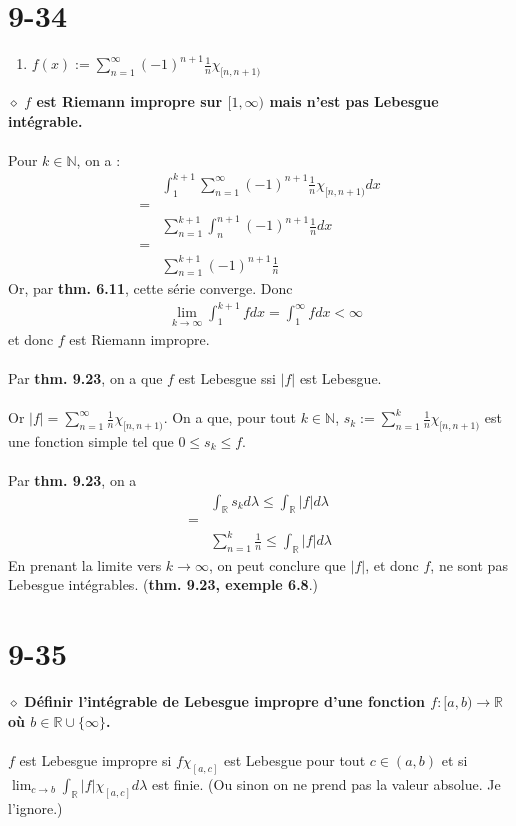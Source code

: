 \documentclass[a4paper,10pt]{article}
\begin{document}
\section*{9-34}
\begin{enumerate}
	\item $f(x) := \displaystyle \sum_{n=1}^\infty (-1)^{n+1} \frac{1}{n} \chi_{[n,n+1)}$
\end{enumerate}
$\diamond$ \textbf{$f$ est Riemann impropre sur $[1,\infty)$ mais n'est pas Lebesgue intégrable.}
\\
\\
Pour $k \in \mathbb{N}$, on a : 
\begin{align*}
	& \int_1^{k+1} \sum_{n=1}^\infty (-1)^{n+1} \frac{1}{n} \chi_{[n, n+1)} dx \\
	= \\
	& \sum_{n=1}^{k+1} \int_n^{n+1} (-1)^{n+1} \frac{1}{n} dx \\
	= \\
	& \sum_{n=1}^{k+1} (-1)^{n+1} \frac{1}{n}
\end{align*}
Or, par \textbf{thm. 6.11}, cette série converge. Donc
\begin{align*}
	& \lim_{k \to \infty} \int_1^{k+1} f dx = \int_1^\infty f dx < \infty
\end{align*}
et donc $f$ est Riemann impropre.
\\
\\
Par \textbf{thm. 9.23}, on a que $f$ est Lebesgue ssi $|f|$ est Lebesgue.
\\
\\
Or $|f| = \displaystyle \sum_{n=1}^\infty \frac{1}{n} \chi_{[n,n+1)}$. On a que, pour tout $k \in \mathbb{N}$, $s_k := \displaystyle \sum_{n=1}^k \frac{1}{n} \chi_{[n,n+1)}$ est une fonction simple tel que $0 \leq s_k \leq f$. 
\\
\\
Par \textbf{thm. 9.23}, on a 
\begin{align*}
	& \int_\mathbb{R} s_k d\lambda \leq \int_\mathbb{R} |f| d\lambda \\
	= \\
	& \sum_{n=1}^k \frac{1}{n} \leq \int_\mathbb{R} |f| d\lambda
\end{align*} 
En prenant la limite vers $k \rightarrow \infty$, on peut conclure que $|f|$, et donc $f$, ne sont pas Lebesgue intégrables. (\textbf{thm. 9.23, exemple 6.8}.)

\section*{9-35}
$\diamond$ \textbf{Définir l'intégrable de Lebesgue impropre d'une fonction $f :[a,b) \rightarrow \mathbb{R}$ où $b \in \mathbb{R} \cup \{\infty \}$.}
\\
\\
$f$ est Lebesgue impropre si $f\chi_{[a,c]}$ est Lebesgue pour tout $c \in (a,b)$ et si $\lim_{c \to b} \int_\mathbb{R} |f|\chi_{[a,c]} d\lambda$ est finie. (Ou sinon on ne prend pas la valeur absolue. Je l'ignore.)
\end{document}
